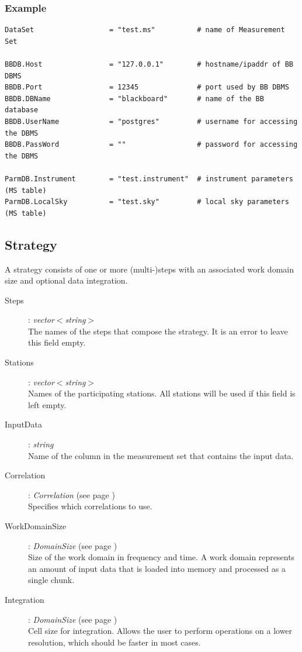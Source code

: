 \documentclass[10pt]{lofar}
\begin{document}
\subsubsection*{Example}
{\footnotesize
\begin{verbatim}
DataSet                  = "test.ms"          # name of Measurement Set

BBDB.Host                = "127.0.0.1"        # hostname/ipaddr of BB DBMS
BBDB.Port                = 12345              # port used by BB DBMS
BBDB.DBName              = "blackboard"       # name of the BB database
BBDB.UserName            = "postgres"         # username for accessing the DBMS
BBDB.PassWord            = ""                 # password for accessing the DBMS

ParmDB.Instrument        = "test.instrument"  # instrument parameters (MS table)
ParmDB.LocalSky          = "test.sky"         # local sky parameters (MS table)
\end{verbatim}
}

\subsection*{Strategy}
A strategy consists of one or more (multi-)steps with an associated work domain
size and optional data integration.
\begin{description}
\item [Steps] : \emph{vector$<$string$>$} \\
    The names of the steps that compose the strategy. It is an error to leave
    this field empty.
\item [Stations] : \emph{vector$<$string$>$} \\
    Names of the participating stations. All stations will be used if this
    field is left empty.
\item [InputData] : \emph{string} \\
    Name of the column in the measurement set that contains the input data.
\item [Correlation] : \emph{Correlation} (see page \pageref{app-correlation}) \\
    Specifies which correlations to use.
\item [WorkDomainSize] : \emph{DomainSize} (see page \pageref{app-domainsize}) \\
    Size of the work domain in frequency and time. A work domain represents an
    amount of input data that is loaded into memory and processed as a single
    chunk.
\item [Integration] : \emph{DomainSize} (see page \pageref{app-domainsize}) \\
    Cell size for integration. Allows the user to perform operations on a
    lower resolution, which should be faster in most cases.
\end{description}
\end{document}
